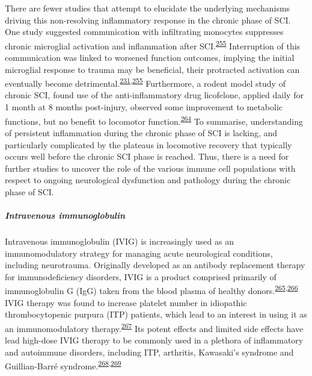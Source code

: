 \documentclass[
]{article}
\begin{document}
There are fewer studies that attempt to elucidate the underlying mechanisms driving this non-resolving inflammatory response in the chronic phase of SCI.
One study suggested communication with infiltrating monocytes suppresses chronic microglial activation and inflammation after SCI.\textsuperscript{\protect\hyperlink{ref-greenhalgh_peripherally_2018}{255}}
Interruption of this communication was linked to worsened function outcomes, implying the initial microglial response to trauma may be beneficial, their protracted activation can eventually become detrimental.\textsuperscript{\protect\hyperlink{ref-bellver-landete_microglia_2019}{231},\protect\hyperlink{ref-greenhalgh_peripherally_2018}{255}}
Furthermore, a rodent model study of chronic SCI, found use of the anti-inflammatory drug licofelone, applied daily for 1 month at 8 months post-injury, observed some improvement to metabolic functions, but no benefit to locomotor function.\textsuperscript{\protect\hyperlink{ref-dulin_licofelone_2013}{264}}
To summarise, understanding of persistent inflammation during the chronic phase of SCI is lacking, and particularly complicated by the plateaus in locomotive recovery that typically occurs well before the chronic SCI phase is reached.
Thus, there is a need for further studies to uncover the role of the various immune cell populations with respect to ongoing neurological dysfunction and pathology during the chronic phase of SCI.

\hypertarget{intravenous-immunoglobulin}{%
\subparagraph{Intravenous immunoglobulin}\label{intravenous-immunoglobulin}}

Intravenous immunoglobulin (IVIG) is increasingly used as an immunomodulatory strategy for managing acute neurological conditions, including neurotrauma.
Originally developed as an antibody replacement therapy for immunodeficiency disorders, IVIG is a product comprised primarily of immunoglobulin G (IgG) taken from the blood plasma of healthy donors.\textsuperscript{\protect\hyperlink{ref-bayry_intravenous_2011}{265},\protect\hyperlink{ref-schwab_intravenous_2013}{266}}
IVIG therapy was found to increase platelet number in idiopathic thrombocytopenic purpura (ITP) patients, which lead to an interest in using it as an immunomodulatory therapy.\textsuperscript{\protect\hyperlink{ref-imbach_high-dose_1981}{267}}
Its potent effects and limited side effects have lead high-dose IVIG therapy to be commonly used in a plethora of inflammatory and autoimmune disorders, including ITP, arthritis, Kawasaki's syndrome and Guillian-Barré syndrome.\textsuperscript{\protect\hyperlink{ref-lunemann_intravenous_2015}{268},\protect\hyperlink{ref-stangel_intravenous_1998}{269}}
\end{document}
